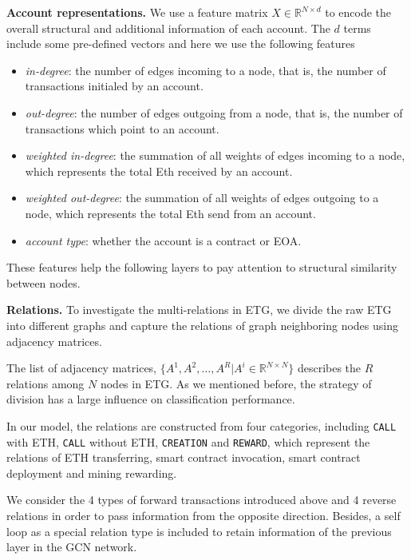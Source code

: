 \textbf{Account representations.} We use a feature matrix $X \in \mathbb{R}^{N \times d}$ to encode the overall structural and additional information of each account. The $d$ terms include some pre-defined vectors and here we use the following features
\begin{itemize}
	\item \emph{in-degree}: the number of edges incoming to a node, that is, the number of transactions initialed by an account.
	\item \emph{out-degree}: the number of edges outgoing from a node, that is, the number of transactions which point to an account.
	\item \emph{weighted in-degree}: the summation of all weights of edges incoming to a node, which represents the total Eth received by an account. 
	\item \emph{weighted out-degree}: the summation of all weights of edges outgoing to a node, which represents the total Eth send from an account. 
	\item \emph{account type}: whether the account is a contract or EOA.
\end{itemize}


These features help the following layers to pay attention to structural similarity between nodes.

\textbf{Relations.} To investigate the multi-relations in ETG, we divide the raw ETG into different graphs and capture the relations of graph neighboring nodes using adjacency matrices. 

The list of adjacency matrices, $\{A^1,A^2,\dots,A^R|A^i\in \mathbb{R}^{N \times N}\}$ describes the $R$ relations among $N$ nodes in ETG. As we mentioned before, the strategy of division has a large influence on classification performance. 

In our model, the relations are constructed from four categories, including \texttt{CALL} with ETH, \texttt{CALL} without ETH, \texttt{CREATION} and \texttt{REWARD}, which represent the relations of ETH transferring, smart contract invocation, smart contract deployment and mining rewarding. 

We consider the 4 types of forward transactions introduced above and 4 reverse relations in order to pass information from the opposite direction. Besides, a self loop as a special relation type is included to retain information of the previous layer in the GCN network. 

